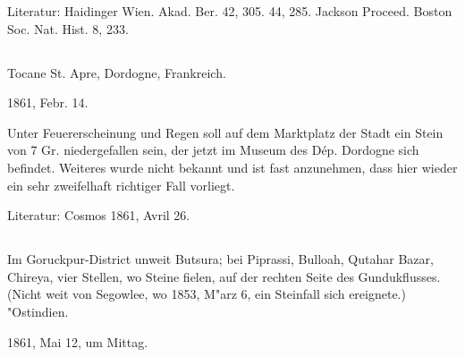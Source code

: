 \documentclass[a4paper, 11pt, oneside]{article}
\begin{document}
\normalsize
Literatur: Haidinger Wien. Akad. Ber. 42, 305. 44, 285. Jackson Proceed. Boston Soc. Nat. Hist. 8, 233.

\subsection{}
\LARGE
\paragraph{}
Tocane St. Apre, Dordogne, Frankreich.

1861, Febr. 14.

Unter Feuererscheinung und Regen soll auf dem Marktplatz der Stadt ein Stein von 7 Gr. niedergefallen sein, der jetzt im Museum des Dép. Dordogne sich befindet. Weiteres wurde nicht bekannt und ist fast anzunehmen, dass hier wieder ein sehr zweifelhaft richtiger Fall vorliegt.

\normalsize
Literatur: Cosmos 1861, Avril 26.

\subsection{}
\LARGE
\paragraph{}
Im Goruckpur-District unweit Butsura; bei Piprassi, Bulloah, Qutahar Bazar, Chireya, vier Stellen, wo Steine fielen, auf der rechten Seite des Gundukflusses. (Nicht weit von Segowlee, wo 1853, M"arz 6, ein Steinfall sich ereignete.) "Ostindien.

1861, Mai 12, um Mittag.
\end{document}
